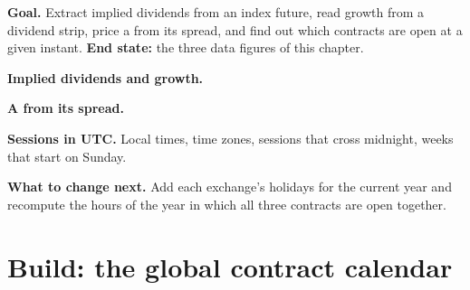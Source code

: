 \begin{tutorial}
\textbf{Goal.} Extract implied dividends from an index future, read growth
from a dividend strip, price a  from its spread, and find
out which contracts are open at a given instant. \textbf{End state:} the
three data figures of this chapter.
\begin{tutsteps}
\item \textbf{Implied dividends and growth.}
\label{lst:m1:index-and-single-stock-futures-worldwide:implied}
\item \textbf{A  from its spread.}
\label{lst:m1:index-and-single-stock-futures-worldwide:trf}
\item \textbf{Sessions in UTC.} Local times, time zones, sessions that cross
midnight, weeks that start on Sunday.
\label{lst:m1:index-and-single-stock-futures-worldwide:session}
\end{tutsteps}
\textbf{What to change next.} Add each exchange's holidays for the current
year and recompute the hours of the year in which all three contracts are
open together.
\end{tutorial}

\section{Build: the global contract calendar}\label{bld:m1:index-and-single-stock-futures-worldwide:calendar}


